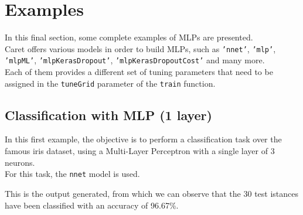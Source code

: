 \documentclass{article}
\begin{document}
\pagebreak

\section{Examples}
In this final section, some complete examples of MLPs are presented.\\
Caret offers various models in order to build MLPs, such as \texttt{'nnet'}, \texttt{'mlp'}, \texttt{'mlpML'}, \texttt{'mlpKerasDropout'}, \texttt{'mlpKerasDropoutCost'} and many more.\\

Each of them provides a different set of tuning parameters that need to be assigned in the \texttt{tuneGrid} parameter of the \texttt{train} function.\\

\subsection{Classification with MLP (1 layer)}
In this first example, the objective is to perform a classification task over the famous iris dataset, using a Multi-Layer Perceptron with a single layer of 3 neurons.\\
For this task, the \texttt{nnet} model is used.\\



\pagebreak

This is the output generated, from which we can observe that the 30 test istances have been classified with an accuracy of 96.67\%.\\
\end{document}
